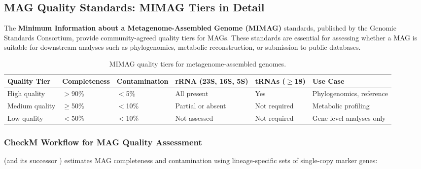 \subsection{MAG Quality Standards: MIMAG Tiers in Detail}
\label{subsec:metagenomics:mimag}

The \textbf{Minimum Information about a Metagenome-Assembled Genome (MIMAG)} standards, published by the Genomic Standards Consortium, provide community-agreed quality tiers for MAGs. These standards are essential for assessing whether a MAG is suitable for downstream analyses such as phylogenomics, metabolic reconstruction, or submission to public databases.

\begin{table}[htbp]
\centering
\caption{MIMAG quality tiers for metagenome-assembled genomes.}
\label{tab:metagenomics:mimag_tiers}
\footnotesize
\begin{tabularx}{\textwidth}{@{}p{1.7cm} p{1.8cm} p{1.8cm} p{2.6cm} p{1.7cm} X@{}}
\toprule
\textbf{Quality Tier} & \textbf{Completeness} & \textbf{Contamination} & \textbf{rRNA (23S, 16S, 5S)} & \textbf{tRNAs ($\geq$18)} & \textbf{Use Case} \\
\midrule
High quality & $>$90\% & $<$5\% & All present & Yes & Phylogenomics, reference \\
Medium quality & $\geq$50\% & $<$10\% & Partial or absent & Not required & Metabolic profiling \\
Low quality & $<$50\% & $<$10\% & Not assessed & Not required & Gene-level analyses only \\
\bottomrule
\end{tabularx}
\end{table}

\subsubsection{CheckM Workflow for MAG Quality Assessment}

 (and its successor ) estimates MAG completeness and contamination using lineage-specific sets of single-copy marker genes:

